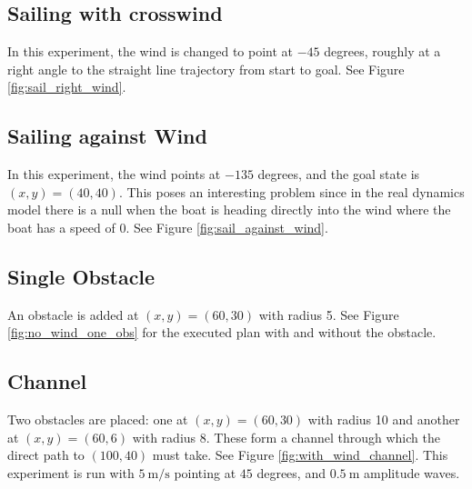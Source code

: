 \documentclass[conference]{IEEEtran}
\begin{document}
\subsection{Sailing with crosswind}

In this experiment, the wind is changed to point at \(-45\) degrees, roughly at a right angle to the straight line trajectory from start to goal. See Figure \ref{fig:sail_right_wind}.

\subsection{Sailing against Wind}

In this experiment, the wind points at \(-135\) degrees, and the goal state is \((x,y) = (40,40)\).
This poses an interesting problem since in the real dynamics model there is a null when the boat is heading directly into the wind where the boat has a speed of 0. See Figure \ref{fig:sail_against_wind}.

\subsection{Single Obstacle}

An obstacle is added at \((x,y)=(60,30)\) with radius 5. See Figure \ref{fig:no_wind_one_obs} for the executed plan with and without the obstacle.

\subsection{Channel}

Two obstacles are placed: one at \((x,y) = (60,30)\) with radius 10 and another at \((x,y) = (60,6)\) with radius 8. These form a channel through which the direct path to \((100,40)\) must take. See Figure \ref{fig:with_wind_channel}. This experiment is run with \(\SI{5}{\meter/\second}\) pointing at \(45\) degrees, and \(\SI{0.5}{\meter}\) amplitude waves.
\end{document}
